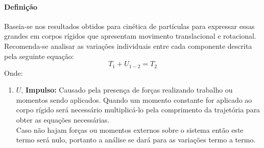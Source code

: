 \documentclass{article}
\begin{document}
            \paragraph{Definição}Baseia-se nos resultados obtidos para cinética de partículas para expressar essas grandes em corpos rígidos que apresentam movimento translacional e rotacional. Recomenda-se analisar as variações individuais entre cada componente descrita pela seguinte equação:
                \begin{equation}
                    \boxed{
                        T_{1} + U_{1-2} = T_{2}
                    }
                \end{equation}
            Onde:
                \begin{enumerate}[rightmargin = \leftmargin]
                    \item $U$, \textbf{Impulso:} Causado pela presença de forças realizando trabalho ou momentos sendo aplicados. Quando um momento constante for aplicado ao corpo rígido será necessário multiplicá-lo pela comprimento da trajetória para obter as equações necessárias.\\
                    Caso não hajam forças ou momentos externos sobre o sistema então este termo será nulo, portanto a análise se dará para as variações termo a termo.


\end{enumerate}
\end{document}
